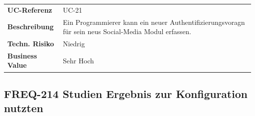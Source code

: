 \begin{longtable}[c]{@{}ll@{}}
\toprule
\begin{minipage}[t]{0.20\columnwidth}\raggedright\strut
\textbf{UC-Referenz}
\strut\end{minipage} &
\begin{minipage}[t]{0.74\columnwidth}\raggedright\strut
UC-21
\strut\end{minipage}\tabularnewline
\begin{minipage}[t]{0.20\columnwidth}\raggedright\strut
\textbf{Beschreibung}
\strut\end{minipage} &
\begin{minipage}[t]{0.74\columnwidth}\raggedright\strut
Ein Programmierer kann ein neuer Authentifizierungsvoragn für sein neus
Social-Media Modul erfassen.
\strut\end{minipage}\tabularnewline
\begin{minipage}[t]{0.20\columnwidth}\raggedright\strut
\textbf{Techn. Risiko}
\strut\end{minipage} &
\begin{minipage}[t]{0.74\columnwidth}\raggedright\strut
Niedrig
\strut\end{minipage}\tabularnewline
\begin{minipage}[t]{0.20\columnwidth}\raggedright\strut
\textbf{Business Value}
\strut\end{minipage} &
\begin{minipage}[t]{0.74\columnwidth}\raggedright\strut
Sehr Hoch
\strut\end{minipage}\tabularnewline
\bottomrule
\end{longtable}

\subsection{FREQ-214 Studien Ergebnis zur Konfiguration
nutzten}\label{freq-214-studien-ergebnis-zur-konfiguration-nutzten}

